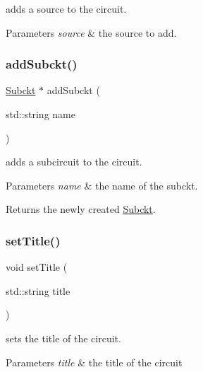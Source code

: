 adds a source to the circuit. 


\begin{DoxyParams}{Parameters}
{\em source} & the source to add. \\
\hline
\end{DoxyParams}
\mbox{\label{class_s_p_i_c_e_1_1_circuit_a0d1352e46d4537ce1e5f651de40e91a6}} 
\subsubsection{\texorpdfstring{add\+Subckt()}{addSubckt()}}
{\footnotesize\ttfamily \hyperlink{class_s_p_i_c_e_1_1_subckt}{Subckt} $\ast$ add\+Subckt (\begin{DoxyParamCaption}\item[{std\+::string}]{name }\end{DoxyParamCaption})}



adds a subcircuit to the circuit. 


\begin{DoxyParams}{Parameters}
{\em name} & the name of the subckt.\\
\hline
\end{DoxyParams}
\begin{DoxyReturn}{Returns}
the newly created \hyperlink{class_s_p_i_c_e_1_1_subckt}{Subckt}. 
\end{DoxyReturn}
\mbox{\label{class_s_p_i_c_e_1_1_circuit_a798df9ebd558e22c85eeceb5202e3123}} 
\subsubsection{\texorpdfstring{set\+Title()}{setTitle()}}
{\footnotesize\ttfamily void set\+Title (\begin{DoxyParamCaption}\item[{std\+::string}]{title }\end{DoxyParamCaption})\hspace{0.3cm}{\ttfamily [inline]}}



sets the title of the circuit. 


\begin{DoxyParams}{Parameters}
{\em title} & the title of the circuit \\
\hline
\end{DoxyParams}
